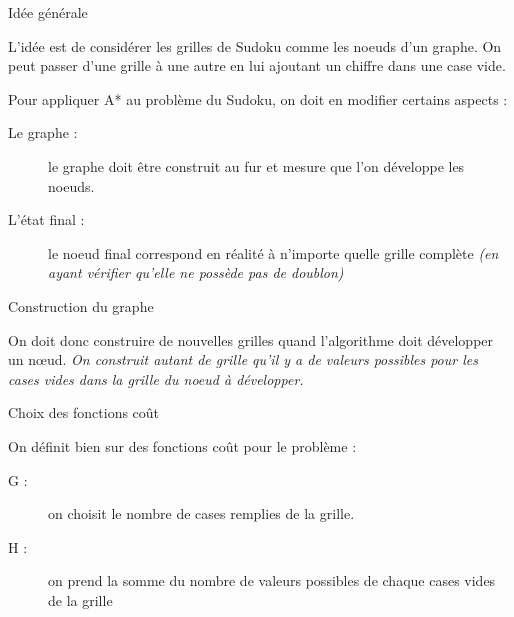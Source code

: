 
\begin{frame}

\begin{block}{Idée générale}

L'idée est de considérer les grilles de Sudoku comme les noeuds d'un graphe. On peut passer d'une grille à une autre en lui ajoutant un chiffre dans une case vide.

\bigskip

Pour appliquer A* au problème du Sudoku, on doit en modifier certains aspects :

\begin{description}
\item[Le graphe :]  le graphe doit être construit au fur et mesure que l'on développe les noeuds.

\item[L'état final :] le noeud final correspond en réalité à n'importe quelle grille complète \textit{(en ayant vérifier qu'elle ne possède pas de doublon)}

\end{description}

\end{block}
\end{frame}

\begin{frame}
\begin{block}{Construction du graphe}

On doit donc construire de nouvelles grilles quand l'algorithme doit développer un nœud. \textit{On construit autant de grille qu'il y a de valeurs possibles pour les cases vides dans la grille du noeud à développer.}

\end{block}

\begin{alertblock}{Choix des fonctions coût}

On définit bien sur des fonctions coût pour le problème :

\begin{description}
\item[G : ] on choisit le nombre de cases remplies de la grille.

\item[H : ] on prend la somme du nombre de valeurs possibles de chaque cases vides de la grille

\end{description}


\end{alertblock}

\end{frame}

